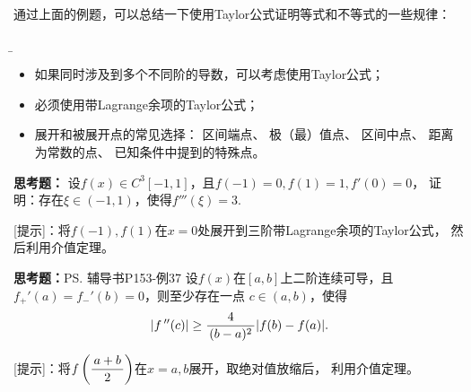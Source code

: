 通过上面的例题，可以总结一下使用Taylor公式证明等式和不等式的一些规律：
{\b
\begin{itemize}
  \item 如果同时涉及到多个不同阶的导数，可以考虑使用Taylor公式；
  \item 必须使用带Lagrange余项的Taylor公式；
  \item 展开和被展开点的常见选择： 区间端点、 极（最）值点、
  区间中点、 距离为常数的点、 已知条件中提到的特殊点。
\end{itemize}
}

{\bf 思考题：} 设$f(x)\in C^3[-1,1]$，且$f(-1)=0,f(1)=1,f'(0)=0$，
证明：存在$\xi\in(-1,1)$，使得$f'''(\xi)=3$.

[提示]：将$f(-1),f(1)$在$x=0$处展开到三阶带Lagrange余项的Taylor公式，
然后利用介值定理。

{\bf 思考题：}\ps{辅导书P153-例37}
设$f(x)$在$[a,b]$上二阶连续可导，且$f_+'(a)=f_-'(b)=0$，则至少存在一点
$c\in(a,b)$，使得
$$|f\,''(c)|\geq \displaystyle\frac{\,{4}\,}{\,{(b-a)^2}\,}|f(b)-f(a)|.$$

[提示]：将$f\left(\displaystyle\frac{\,{a+b}\,}{\,{2}\,}\right)$在$x=a,b$展开，取绝对值放缩后，
利用介值定理。

